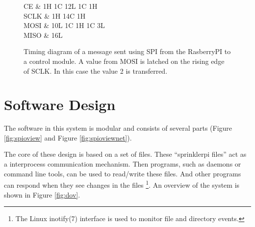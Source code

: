 \documentclass{article}
\begin{document}
\begin{figure}[h!]
\begin{center}
\begin{tikztimingtable}
	[xscale=2.0, yscale=2.0]
	CE	 & {1H} 1{C} {12L} 1{C} {1H} \\
	SCLK & {1H} 14{C} {1H} \\
	MOSI & 10L 1{C} 1{H} 1{C} 3L \\
	MISO & 16L \\
\end{tikztimingtable}
\end{center}
\caption{Timing diagram of a message sent using SPI from
the RasberryPI to a control module.
A value from MOSI is latched on the rising edge of SCLK.
In this case the value 2 is transferred.}
\label{fig:timing}
\end{figure}

%
%
%



\pagebreak

\FloatBarrier
\section{Software Design}
\label{sec:swdesign}

The software in this system is modular and consists of several parts
(Figure \ref{fig:spioview} and Figure \ref{fig:spioviewnet}).

The core of these design is based on a set of files.
These ``sprinklerpi files'' act as a interprocess communication mechanism.
Then programs, such as daemons or command line tools, can be used to
read/write these files.
And other programs can respond when they see changes in the files
\footnote{The Linux inotify(7) interface is used to monitor file
and directory events.}.
An overview of the system is shown in Figure \ref{fig:dov}.
\end{document}
